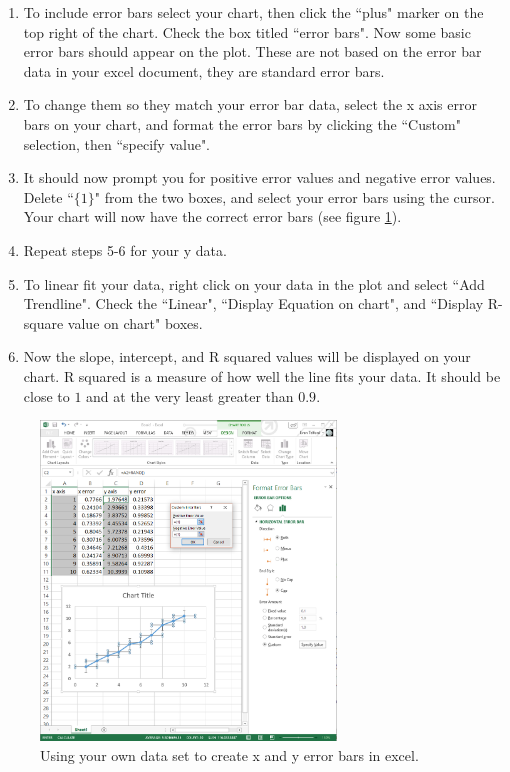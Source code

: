 \documentclass[letterpaper, 12pt]{book}
\begin{document}
\begin{enumerate}
\item To include error bars select your chart, then click the ``plus" marker on the top right of the chart. Check the box titled ``error bars". Now some basic error bars should appear on the plot. These are not based on the error bar data in your excel document, they are standard error bars.
\item To change them so they match your error bar data, select the x axis error bars on your chart, and format the error bars by clicking the ``Custom" selection, then ``specify value".
\item It should now prompt you for positive error values and negative error values. Delete ``$\{1\}$" from the two boxes, and select your error bars using the cursor. Your chart will now have the correct error bars (see figure \ref{fig:excel2}).

\item Repeat steps 5-6 for your y data.
\item To linear fit your data, right click on your data in the plot and select ``Add Trendline". Check the ``Linear", ``Display Equation on chart", and ``Display R-square value on chart" boxes.
\item Now the slope, intercept, and R squared values will be displayed on your chart. R squared is a measure of how well the line fits your data. It should be close to $1$ and at the very least greater than $0.9$.
\end{enumerate}

\begin{figure}[h!]
\centering
\includegraphics[height=0.4\textheight, width=0.7\textwidth]{./pic/image5.png}
\caption{Using your own data set to create x and y error bars in excel.}
\label{fig:excel2}
\end{figure}
\end{document}
